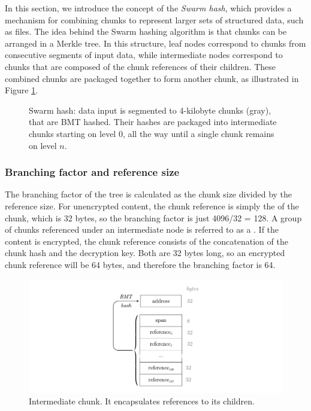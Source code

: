 In this section, we introduce the concept of the \emph{Swarm hash}, which provides a mechanism for combining chunks to represent larger sets of structured data, such as files. The idea behind the Swarm hashing algorithm is that chunks can be arranged in a Merkle tree. In this structure, leaf nodes correspond to chunks from consecutive segments of input data, while intermediate nodes correspond to chunks that are composed of the chunk references of their children. These combined chunks are packaged together to form another chunk, as illustrated in Figure \ref{fig:Swarm-hash}. 



\begin{figure}[htbp]
\centering
\resizebox{1\textwidth}{!}{
    
}
\caption[Swarm hash \statusgreen]{Swarm hash: data input is segmented to 4-kilobyte chunks (gray), that are BMT hashed. Their hashes are packaged into intermediate chunks starting on level $0$, all the way until a single chunk remains on level $n$. }
\label{fig:Swarm-hash}
\end{figure}

\subsubsection{Branching factor and reference size}

The branching factor of the tree is calculated as the chunk size divided by the reference size. For unencrypted content, the chunk reference is simply the  of the chunk, which is 32 bytes, so the branching factor is just 4096/32 =  128. A group of chunks referenced under an intermediate node is referred to as a . If the content is encrypted, the chunk reference consists of the concatenation of the chunk hash and the decryption key. Both are 32 bytes long, so an encrypted chunk reference will be 64 bytes, and therefore the branching factor is 64. 


\begin{figure}[htbp]
\centering
\includegraphics[width=\textwidth]{fig/intermediate-chunk-3.pdf}
\caption[Intermediate chunk \statusgreen]{Intermediate chunk. It encapsulates references to its children.}
\label{fig:intermediate-chunk}
\end{figure}

